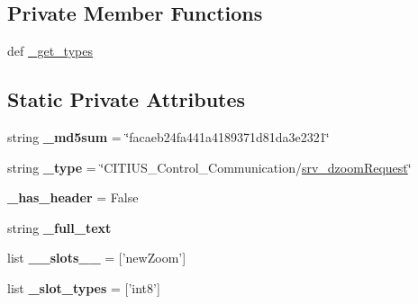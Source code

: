 \subsection*{\-Private \-Member \-Functions}
\begin{DoxyCompactItemize}
\item 
def \hyperlink{class_c_i_t_i_u_s___control___communication_1_1srv_1_1__srv__dzoom_1_1srv__dzoom_request_ab5ce39448788512d8f6a9c61a9f5f21d}{\-\_\-get\-\_\-types}
\end{DoxyCompactItemize}
\subsection*{\-Static \-Private \-Attributes}
\begin{DoxyCompactItemize}
\item 
\hypertarget{class_c_i_t_i_u_s___control___communication_1_1srv_1_1__srv__dzoom_1_1srv__dzoom_request_afb147a2b5779d464826234df30680ecb}{string {\bfseries \-\_\-md5sum} = \char`\"{}facaeb24fa441a4189371d81da3e2321\char`\"{}}\label{class_c_i_t_i_u_s___control___communication_1_1srv_1_1__srv__dzoom_1_1srv__dzoom_request_afb147a2b5779d464826234df30680ecb}

\item 
\hypertarget{class_c_i_t_i_u_s___control___communication_1_1srv_1_1__srv__dzoom_1_1srv__dzoom_request_ac377bbca9a82da680a113f14f656822a}{string {\bfseries \-\_\-type} = \char`\"{}\-C\-I\-T\-I\-U\-S\-\_\-\-Control\-\_\-\-Communication/\hyperlink{class_c_i_t_i_u_s___control___communication_1_1srv_1_1__srv__dzoom_1_1srv__dzoom_request}{srv\-\_\-dzoom\-Request}\char`\"{}}\label{class_c_i_t_i_u_s___control___communication_1_1srv_1_1__srv__dzoom_1_1srv__dzoom_request_ac377bbca9a82da680a113f14f656822a}

\item 
\hypertarget{class_c_i_t_i_u_s___control___communication_1_1srv_1_1__srv__dzoom_1_1srv__dzoom_request_abb3eb5e70090b97a7f87f4999fe12943}{{\bfseries \-\_\-has\-\_\-header} = \-False}\label{class_c_i_t_i_u_s___control___communication_1_1srv_1_1__srv__dzoom_1_1srv__dzoom_request_abb3eb5e70090b97a7f87f4999fe12943}

\item 
string {\bfseries \-\_\-full\-\_\-text}
\item 
\hypertarget{class_c_i_t_i_u_s___control___communication_1_1srv_1_1__srv__dzoom_1_1srv__dzoom_request_a4320fe31d4e19180a7e869033b3f3190}{list {\bfseries \-\_\-\-\_\-slots\-\_\-\-\_\-} = \mbox{[}'new\-Zoom'\mbox{]}}\label{class_c_i_t_i_u_s___control___communication_1_1srv_1_1__srv__dzoom_1_1srv__dzoom_request_a4320fe31d4e19180a7e869033b3f3190}

\item 
\hypertarget{class_c_i_t_i_u_s___control___communication_1_1srv_1_1__srv__dzoom_1_1srv__dzoom_request_a6b05919bc311ce1f284591a5a324d2aa}{list {\bfseries \-\_\-slot\-\_\-types} = \mbox{[}'int8'\mbox{]}}\label{class_c_i_t_i_u_s___control___communication_1_1srv_1_1__srv__dzoom_1_1srv__dzoom_request_a6b05919bc311ce1f284591a5a324d2aa}

\end{DoxyCompactItemize}


